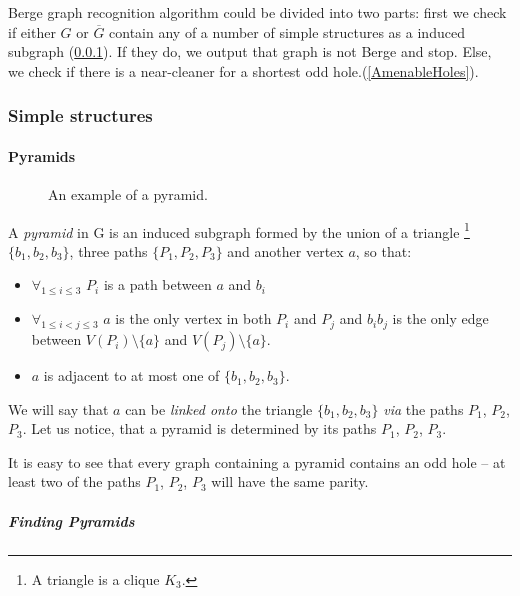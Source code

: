 \documentclass{article}
\begin{document}
Berge graph recognition algorithm could be divided into two parts: first we check if either $G$ or $\overline{G}$ contain any of a number of simple structures as a induced subgraph (\ref{SimpleStructures}). If they do, we output that graph is not Berge and stop. Else, we check if there is a near-cleaner for a shortest odd hole.(\ref{AmenableHoles}).

\subsubsection{Simple structures}
\label{SimpleStructures}

\paragraph{Pyramids}


\begin{wrapfigure}{r}{0.35\textwidth}
	
	\caption{An example  of a pyramid.}%
	\vspace{-1.2cm}
\end{wrapfigure}

A \emph{pyramid} in G is an induced subgraph formed by the union of a triangle \footnote{A triangle is a clique $K_3$.} $\{b_1,b_2,b_3\}$, three paths $\{P_1, P_2, P_3\}$ and another vertex $a$, so that:
\begin{itemize}
	\item $\forall_{1\leq i \leq 3}$ $P_i$ is a path between $a$ and $b_i$
	\item $\forall_{1\leq i < j \leq 3}$ $a$ is the only vertex in both $P_i$ and $P_j$ and $b_ib_j$ is the only edge between $V(P_i)\setminus\{a\}$ and $V(P_j)\setminus\{a\}$.
	\item $a$ is adjacent to at most one of $\{b_1, b_2, b_3\}$.
\end{itemize}

We will say that $a$ can be \emph{linked onto} the triangle $\{b_1, b_2, b_3\}$ \emph{via} the paths $P_1$, $P_2$, $P_3$. Let us notice, that a pyramid is determined by its paths $P_1$, $P_2$, $P_3$.

It is easy to see that every graph containing a pyramid contains an odd hole -- at least two of the paths $P_1$, $P_2$, $P_3$ will have the same parity.

\subparagraph{Finding Pyramids}
\end{document}
